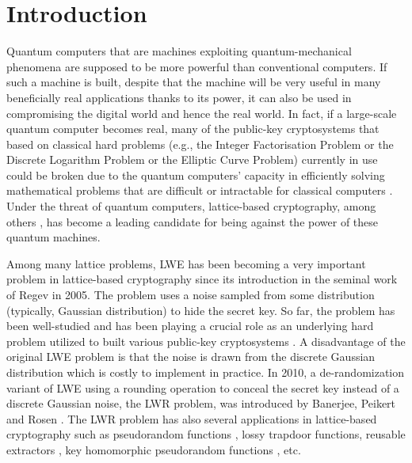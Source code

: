 \documentclass{cta-author}
\begin{document}
\section{Introduction}


Quantum computers that are machines exploiting quantum-mechanical phenomena are supposed to be more powerful than conventional computers. If such a machine is built, despite that the machine will be very useful in many beneficially real applications thanks to its power, it can also be used in compromising the digital world and hence the real world. In fact, if a large-scale quantum computer becomes real, many of the public-key cryptosystems that based on classical hard problems  (e.g., the Integer Factorisation Problem or the Discrete Logarithm Problem or the Elliptic Curve Problem) currently in use could be broken due to the quantum computers' capacity in efficiently solving mathematical problems that are difficult or intractable for classical computers \cite{Sho97}. Under the threat of quantum computers, lattice-based cryptography, among others \cite{Ber09}, has become a leading candidate for being against the power of these quantum machines. 


Among many lattice problems, LWE has been becoming a very important problem in lattice-based cryptography since its introduction in the seminal work of Regev \cite{Reg09} in 2005. The problem uses a noise sampled from some distribution (typically, Gaussian distribution) to hide the secret key. So far, the problem has been well-studied and has been playing a crucial role as an underlying hard problem utilized to built various public-key cryptosystems \cite{Reg09, Pei09, GPV08}. A disadvantage of the original LWE problem is that the noise is drawn from the discrete Gaussian distribution which is costly to implement in practice. In 2010, a de-randomization variant of LWE using a rounding operation to conceal the secret key instead of a discrete Gaussian noise, the LWR problem, was introduced by Banerjee, Peikert and Rosen \cite{BPR12}. The LWR problem has also several applications in lattice-based cryptography such as pseudorandom functions \cite{BPR12}, lossy trapdoor functions, reusable extractors \cite{AKPW13}, key homomorphic pseudorandom functions \cite{BLMR13}, etc.  
\end{document}
